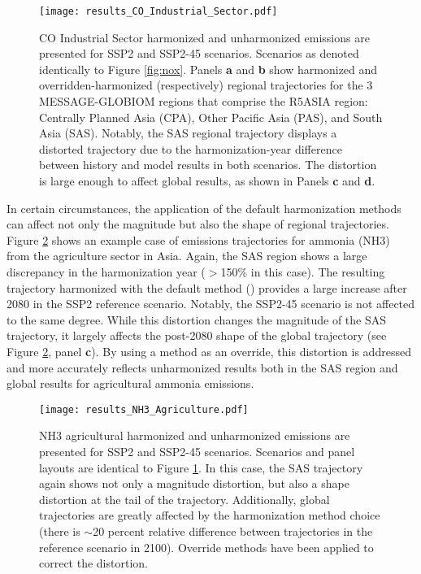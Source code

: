 \begin{figure}
  \begin{center}
    \texttt{[image: results\_CO\_Industrial\_Sector.pdf]}
    \caption[]{
      \label{fig:co}
      CO Industrial Sector harmonized and unharmonized emissions are presented
      for SSP2 and SSP2-45 scenarios. Scenarios as denoted identically to Figure
      \ref{fig:nox}. Panels \textbf{a} and \textbf{b} show harmonized and
      overridden-harmonized (respectively) regional trajectories for the 3
      MESSAGE-GLOBIOM regions that comprise the R5ASIA region: Centrally Planned
      Asia (CPA), Other Pacific Asia (PAS), and South Asia (SAS). Notably, the
      SAS regional trajectory displays a distorted trajectory due to the
      harmonization-year difference between history and model results in both
      scenarios. The distortion is large enough to affect global results, as
      shown in Panels \textbf{c} and \textbf{d}.  
}
  \end{center}
\end{figure}

In certain circumstances, the application of the default harmonization methods
can affect not only the magnitude but also the shape of regional
trajectories. Figure \ref{fig:nh3} shows an example case of emissions
trajectories for ammonia (NH3) from the agriculture sector in Asia. Again, the
SAS region shows a large discrepancy in the harmonization year ($>$150\% in
this case). The resulting trajectory harmonized with the default method
() provides a large increase after 2080 in the SSP2
reference scenario. Notably, the SSP2-45 scenario is not affected to the same
degree. While this distortion changes the magnitude of the SAS trajectory, it
largely affects the post-2080 shape of the global trajectory (see Figure
\ref{fig:nh3}, panel \textbf{c}). By using a  method as an
override, this distortion is addressed and more accurately reflects unharmonized
results both in the SAS region and global results for agricultural ammonia
emissions.

\begin{figure}
  \begin{center}
    \texttt{[image: results\_NH3\_Agriculture.pdf]}
    \caption[]{
      \label{fig:nh3}
      NH3 agricultural harmonized and unharmonized emissions are presented for
      SSP2 and SSP2-45 scenarios. Scenarios and panel layouts are identical to
      Figure \ref{fig:co}. In this case, the SAS trajectory again shows not only
      a magnitude distortion, but also a shape distortion at the tail of the
      trajectory. Additionally, global trajectories are greatly affected by the
      harmonization method choice (there is $\sim$20 percent relative difference
      between trajectories in the reference scenario in 2100). Override methods
      have been applied to correct the distortion.  }
  \end{center}
\end{figure}




